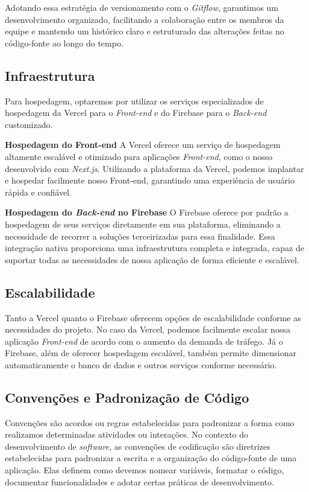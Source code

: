 Adotando essa estratégia de versionamento com o \textit{Gitflow}, garantimos um desenvolvimento organizado, facilitando a colaboração entre os membros da equipe e mantendo um histórico claro e estruturado das alterações feitas no código-fonte ao longo do tempo.

\subsection{Infraestrutura}
Para hospedagem, optaremos por utilizar os serviços especializados de hospedagem da Vercel para o \textit{Front-end} e do Firebase para o \textit{Back-end} customizado.

\textbf{Hospedagem do Front-end} \newline
A Vercel oferece um serviço de hospedagem altamente escalável e otimizado para aplicações \textit{Front-end}, como o nosso desenvolvido com \textit{Next.js}. Utilizando a plataforma da Vercel, podemos implantar e hospedar facilmente nosso Front-end, garantindo uma experiência de usuário rápida e confiável.

\textbf{Hospedagem do \textit{Back-end} no Firebase} \newline
O Firebase oferece por padrão a hospedagem de seus serviços diretamente em sua plataforma, eliminando a necessidade de recorrer a soluções terceirizadas para essa finalidade. Essa integração nativa proporciona uma infraestrutura completa e integrada, capaz de suportar todas as necessidades de nossa aplicação de forma eficiente e escalável.

\subsection{Escalabilidade}
Tanto a Vercel quanto o Firebase oferecem opções de escalabilidade conforme as necessidades do projeto. No caso da Vercel, podemos facilmente escalar nossa aplicação \textit{Front-end} de acordo com o aumento da demanda de tráfego. Já o Firebase, além de oferecer hospedagem escalável, também permite dimensionar automaticamente o banco de dados e outros serviços conforme necessário.

\subsection{Convenções e Padronização de Código}

Convenções são acordos ou regras estabelecidas para padronizar a forma como realizamos determinadas atividades ou interações. No contexto do desenvolvimento de \textit{software}, as convenções de codificação são diretrizes estabelecidas para padronizar a escrita e a organização do código-fonte de uma aplicação. Elas definem como devemos nomear variáveis, formatar o código, documentar funcionalidades e adotar certas práticas de desenvolvimento.

